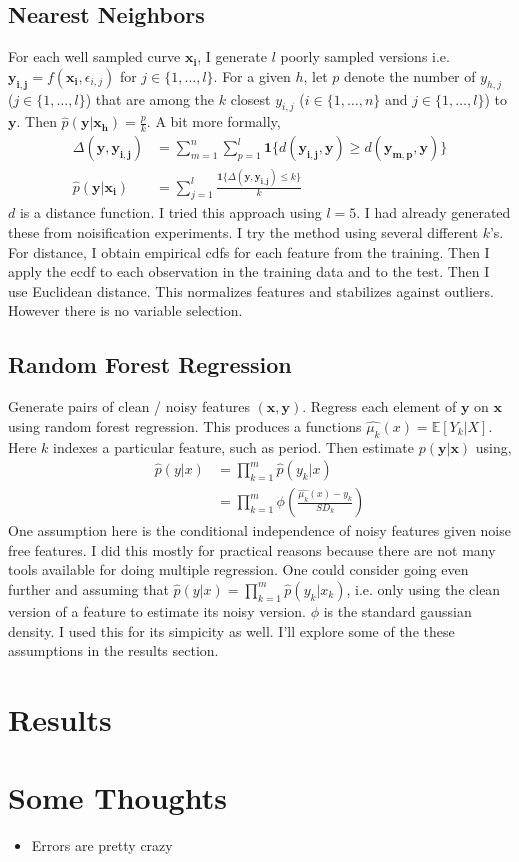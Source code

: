 \documentclass[10pt]{article}
\begin{document}
\subsection{Nearest Neighbors}
For each well sampled curve $\mathbf{x_i}$, I generate $l$ poorly sampled versions i.e. $\mathbf{y_{i,j}} = f(\mathbf{x_i},\epsilon_{i,j})$ for $j \in \{1, \ldots, l\}$. For a given $h$, let $p$ denote the number of $y_{h,j}$ ($j \in \{1, \ldots ,l\}$) that are among the $k$ closest $y_{i,j}$ ($i \in \{1, \ldots ,n\}$ and $j \in \{1, \ldots ,l\}$) to $\mathbf{y}$. Then $\hat{p}(\mathbf{y}|\mathbf{x_h}) = \frac{p}{k}$. A bit more formally,
\begin{align*}
\Delta(\mathbf{y},\mathbf{y_{i,j}}) &= \sum_{m=1}^n \sum_{p=1}^{l} \mathbf{1}\{d(\mathbf{y_{i,j}},\mathbf{y}) \geq d(\mathbf{y_{m,p}},\mathbf{y})\}\\
\hat{p}(\mathbf{y}|\mathbf{x_i}) &= \sum_{j=1}^l \frac{\mathbf{1}\{\Delta(\mathbf{y},\mathbf{y_{i,j}}) \leq k\}}{k}
\end{align*}
$d$ is a distance function. I tried this approach using $l=5$. I had already generated these from noisification experiments. I try the method using several different $k$'s. For distance, I obtain empirical cdfs for each feature from the training. Then I apply the ecdf to each observation in the training data and to the test. Then I use Euclidean distance. This normalizes features and stabilizes against outliers. However there is no variable selection.


\subsection{Random Forest Regression}
Generate pairs of clean / noisy features $(\mathbf{x},\mathbf{y})$. Regress each element of $\mathbf{y}$ on $\mathbf{x}$ using random forest regression. This produces a functions $\hat{\mu_k}(x) = \mathbb{E}[Y_k|X]$. Here $k$ indexes a particular feature, such as period. Then estimate $p(\mathbf{y}|\mathbf{x})$ using,
\begin{align*}
\hat{p}(y | x) &= \prod_{k=1}^m \hat{p}(y_k|x)\\
&=\prod_{k=1}^m \phi \left( \frac{\hat{\mu_k}(x) - y_k} {SD_k}\right)
\end{align*}
One assumption here is the conditional independence of noisy features given noise free features. I did this mostly for practical reasons because there are not many tools available for doing multiple regression. One could consider going even further and assuming that $\hat{p}(y | x) = \prod_{k=1}^m \hat{p}(y_k|x_k)$, i.e. only using the clean version of a feature to estimate its noisy version. $\phi$ is the standard gaussian density. I used this for its simpicity as well. I'll explore some of the these assumptions in the results section.

\section{Results}



\section{Some Thoughts}
\begin{itemize}
\item Errors are pretty crazy
\end{itemize}
\end{document}
